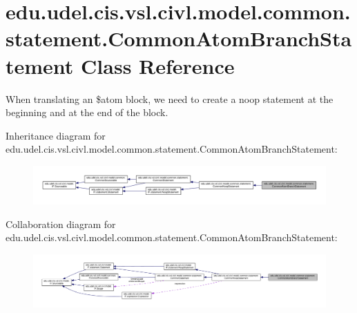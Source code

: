 \hypertarget{classedu_1_1udel_1_1cis_1_1vsl_1_1civl_1_1model_1_1common_1_1statement_1_1CommonAtomBranchStatement}{}\section{edu.\+udel.\+cis.\+vsl.\+civl.\+model.\+common.\+statement.\+Common\+Atom\+Branch\+Statement Class Reference}
\label{classedu_1_1udel_1_1cis_1_1vsl_1_1civl_1_1model_1_1common_1_1statement_1_1CommonAtomBranchStatement}


When translating an \$atom block, we need to create a noop statement at the beginning and at the end of the block.  




Inheritance diagram for edu.\+udel.\+cis.\+vsl.\+civl.\+model.\+common.\+statement.\+Common\+Atom\+Branch\+Statement\+:
\nopagebreak
\begin{figure}[H]
\begin{center}
\leavevmode
\includegraphics[width=350pt]{classedu_1_1udel_1_1cis_1_1vsl_1_1civl_1_1model_1_1common_1_1statement_1_1CommonAtomBranchStatement__inherit__graph}
\end{center}
\end{figure}


Collaboration diagram for edu.\+udel.\+cis.\+vsl.\+civl.\+model.\+common.\+statement.\+Common\+Atom\+Branch\+Statement\+:
\nopagebreak
\begin{figure}[H]
\begin{center}
\leavevmode
\includegraphics[width=350pt]{classedu_1_1udel_1_1cis_1_1vsl_1_1civl_1_1model_1_1common_1_1statement_1_1CommonAtomBranchStatement__coll__graph}
\end{center}
\end{figure}
